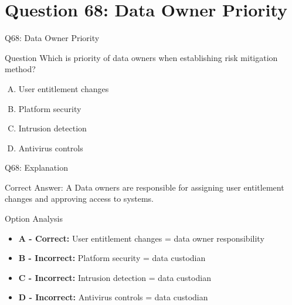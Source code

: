 \documentclass{beamer}
\begin{document}
	\section{Question 68: Data Owner Priority}
	
	\begin{frame}{Q68: Data Owner Priority}
		\begin{block}{Question}
			Which is priority of data owners when establishing risk mitigation method?
		\end{block}
		\begin{enumerate}[(A)]
			\item User entitlement changes
			\item Platform security
			\item Intrusion detection
			\item Antivirus controls
		\end{enumerate}
	\end{frame}
	
	\begin{frame}{Q68: Explanation}
		\begin{block}{Correct Answer: A}
			Data owners are responsible for assigning user entitlement changes and approving access to systems.
		\end{block}
		\begin{block}{Option Analysis}
			\begin{itemize}
				\item \textbf{A - Correct:} User entitlement changes = data owner responsibility
				\item \textbf{B - Incorrect:} Platform security = data custodian
				\item \textbf{C - Incorrect:} Intrusion detection = data custodian
				\item \textbf{D - Incorrect:} Antivirus controls = data custodian
			\end{itemize}
		\end{block}
	\end{frame}
	
	
	
	
	
	
	
\end{document}
